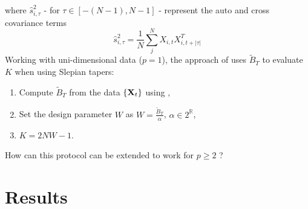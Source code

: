 \documentclass[9pt,journal]{IEEEtran}
\numberwithin{equation}{section}
\begin{document}
where $\hat{s}^2_{i,\tau}$ - for $\tau \in [-(N-1),N-1]$ - represent the auto and cross covariance terms
\begin{equation*}
\hat{s}^2_{i,\tau} = \frac{1}{N}\sum^N_j  X_{i,t} X^T_{i,t+|\tau|}
\end{equation*}
Working with uni-dimensional data ($p = 1$), the approach of \cite{Rosado-Mendez2013} uses $\tilde{B}_T$ to evaluate $K$ when using Slepian tapers:
\begin{tcolorbox}
\begin{enumerate}
\item Compute $\tilde{B}_T$ from the data $\{\bold X_t\}$ using ,
\item Set the design parameter $W$ as $W = \frac{\tilde B_T}{\alpha}$, $\alpha \in 2^{\mathbb{R}}$,
\item $K = 2NW-1$.
\end{enumerate}
\end{tcolorbox}
{\color{red} How can this protocol can be extended to work for $p \geq 2$ ? }
\section{Results}
\label{sec:results}


%


\end{document}

